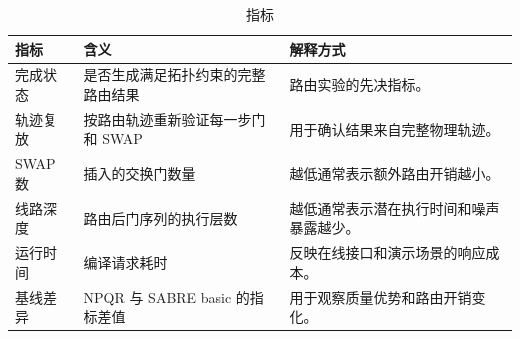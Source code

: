 \begin{table}[H]
  \centering
  \caption{指标}
  \label{tab:metrics}
  \begin{tabularx}{\linewidth}{lYY}
    \toprule
    指标 & 含义 & 解释方式 \\
    \midrule
    完成状态 & 是否生成满足拓扑约束的完整路由结果 & 路由实验的先决指标。\\
    轨迹复放 & 按路由轨迹重新验证每一步门和 SWAP & 用于确认结果来自完整物理轨迹。\\
    SWAP 数 & 插入的交换门数量 & 越低通常表示额外路由开销越小。\\
    线路深度 & 路由后门序列的执行层数 & 越低通常表示潜在执行时间和噪声暴露越少。\\
    运行时间 & 编译请求耗时 & 反映在线接口和演示场景的响应成本。\\
    基线差异 & NPQR 与 SABRE basic 的指标差值 & 用于观察质量优势和路由开销变化。\\
    \bottomrule
  \end{tabularx}
\end{table}
